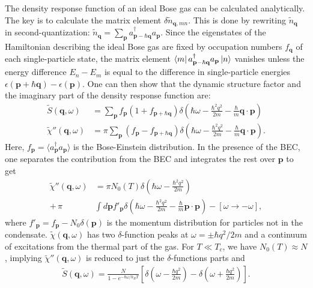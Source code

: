 \documentclass[prl,
twocolumn,
nofootinbib,
amsmath,amssymb,
aps]{revtex4-1}
\newcommand{\f}[2]{\frac{#1}{#2}}
\newcommand{\lp}{\left(}
\newcommand{\rp}{\right)}
\newcommand{\lb}{\left[}
\newcommand{\rb}{\right]}
\begin{document}
The density response function of an ideal Bose gas can be calculated analytically. The key is to calculate the matrix element $\delta \widetilde{n}_{\mathbf{q},mn}$. This is done by rewriting $\widetilde{n}_\mathbf{q}$ in second-quantization: $\widetilde{n}_\mathbf{q} = \sum_\mathbf{p} a^\dagger_{\mathbf{p} - \hbar \mathbf{q}} a_\mathbf{p} $. Since the eigenstates of the Hamiltonian describing the ideal Bose gas are fixed by occupation numbers $f_\mathbf{q}$ of each single-particle state, the matrix element $\bra{m} a^\dagger_{\mathbf{p} - \hbar \mathbf{q}} a_\mathbf{p} \ket{n}$ vanishes unless the energy difference $E_n - E_m$ is equal to the difference in single-particle energies $\epsilon(\mathbf{p} + \hbar \mathbf{q}) - \epsilon(\mathbf{p})$. One can then show that the dynamic structure factor and the imaginary part of the density response function are:
\begin{align*}
\widetilde{S}(\mathbf{q},\omega) &= \sum_\mathbf{p} f_\mathbf{p}(1 + f_{\mathbf{p} + \hbar \mathbf{q}}) \delta 
\lp
\hbar \omega - \f{\hbar^2 q^2}{ 2m} - \f{\hbar }{m} \mathbf{q}\cdot \mathbf{p}
\rp \\
\widetilde{\chi}''(\mathbf{q},\omega) 
&= 
\pi \sum_\mathbf{p} (f_\mathbf{p} - f_{\mathbf{p} + \hbar \mathbf{q}}) \delta 
\lp  
\hbar \omega - \f{\hbar^2 q^2}{ 2m} - \f{\hbar }{m} \mathbf{q}\cdot \mathbf{p}
\rp.
\end{align*}
Here, $f_\mathbf{p} = \langle a^\dagger_\mathbf{p} a_\mathbf{p}\rangle$ is the Bose-Einstein distribution. In the presence of the BEC, one separates the contribution from the BEC and integrates the rest over $\mathbf{p}$ to get
\begin{align*}
\widetilde{\chi}''(\mathbf{q},\omega) &= \pi  N_0(T) \delta \lp \hbar \omega - \f{\hbar^2 q^2}{2m} \rp  \\
 + \, \pi &\int d\mathbf{p} f'_\mathbf{p} \delta \lp \hbar \omega - \f{\hbar^2 q^2}{2m} - \f{\hbar}{m} \mathbf{p}\cdot \mathbf{p} \rp - [\omega \to -\omega], 
\end{align*}
where $f'_\mathbf{p} = f_\mathbf{p} - N_0 \delta(\mathbf{p})$ is the momentum distribution for particles not in the condensate. $\widetilde{\chi}(\mathbf{q},\omega)$ has two $\delta$-function peaks at $\omega = \pm \hbar q^2/2m$ and a continuum of excitations from the thermal part of the gas. For $T \ll T_c$, we have $N_0(T) \approx N$, implying $\widetilde{\chi}''(\mathbf{q},\omega)$ is reduced to just the $\delta$-functions parts and  
\begin{align*}
\widetilde{S}(\mathbf{q},\omega) = \f{N}{1 - e^{-\hbar \omega / k_BT}} \lb \delta\lp \omega - \f{\hbar q^2}{2m} \rp - \delta \lp  \omega + \f{\hbar q^2}{2m} \rp \rb.
\end{align*}
\end{document}
